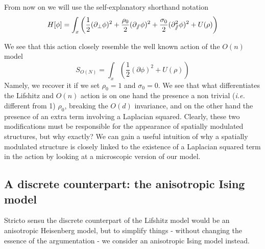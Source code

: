 From now on we will use the self-explanatory shorthand notation
\begin{equation}
H[\phi] = \int_x \left( \frac{1}{2}(\partial_{\perp} \phi)^2 + \frac{\rho_0}{2}(\partial_{\sslash} \phi)^2 + \frac{\sigma_0}{2} (\partial_{\sslash}^2 \phi)^2 + U(\rho) \right)
\end{equation}

We see that this action closely resemble the well known action of the $O(n)$ model
\begin{equation}
S_{O(N)} = \int_x \left( \frac{1}{2}(\partial \phi)^2 + U(\rho) \right)
\end{equation}
Namely, we recover it if we set $\rho_0 = 1$ and $\sigma_0 = 0$. We see that what differentiates the Lifshitz and $O(n)$ action is on one hand the presence a non trivial (\textit{i.e.} different from 1) $\rho_0$, breaking the $O(d)$ invariance, and on the other hand the presence of an extra term involving a Laplacian squared. Clearly, these two modifications must be responsible for the appearance of spatially modulated structures, but why exactly? 
We can gain a useful intuition of why a spatially modulated structure is closely linked to the existence of a Laplacian squared term in the action by looking at a microscopic version of our model. 

\subsection{A discrete counterpart: the anisotropic Ising model}

Stricto sensu the discrete counterpart of the Lifshitz model would be an anisotropic Heisenberg model, but to simplify things - without changing the essence of the argumentation - we consider an anisotropic Ising model instead.

